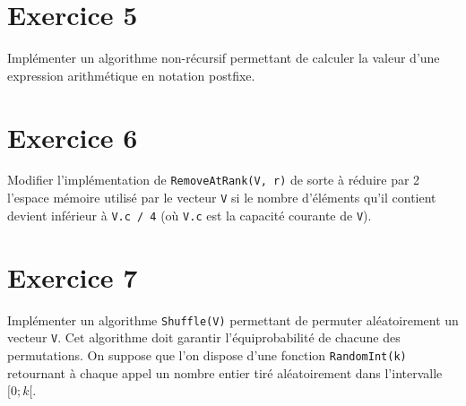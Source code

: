 \documentclass[a4paper,10pt]{article}
\begin{document}
\section*{Exercice 5}

Implémenter un algorithme non-récursif permettant de calculer la valeur d'une expression arithmétique en notation postfixe.

\section*{Exercice 6}

Modifier l'implémentation de \texttt{RemoveAtRank(V, r)} de sorte à réduire par
2 l'espace mémoire utilisé par le vecteur \texttt{V} si le nombre d'éléments
qu'il contient devient inférieur à \texttt{V.c / 4} (où \texttt{V.c} est la capacité
courante de \texttt{V}).

\section*{Exercice 7}

Implémenter un algorithme \texttt{Shuffle(V)} permettant de permuter aléatoirement un vecteur \texttt{V}. Cet algorithme doit garantir l'équiprobabilité de chacune des permutations. On suppose que l'on dispose d'une fonction \texttt{RandomInt(k)} retournant à chaque appel un nombre entier tiré aléatoirement dans l'intervalle $[0; k[$.
\end{document}
